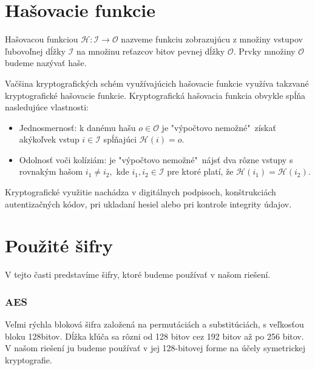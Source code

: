 \section{Hašovacie funkcie}
\begin{mydef}
	Hašovacou funkciou $\mathcal H : \mathcal I \rightarrow \mathcal O$ nazveme funkciu zobrazujúcu z množiny vstupov ľubovoľnej dĺžky $\mathcal I$ na množinu reťazcov bitov pevnej dĺžky $\mathcal O$. Prvky množiny $\mathcal O$ budeme nazývať haše. 
		
\end{mydef}
	Vačšina kryptografických schém využívajúcich hašovacie funkcie využíva takzvané kryptografické hašovacie funkcie. Kryptografická hašovacia funkcia obvykle spĺňa nasledujúce vlastnosti:
	\begin{itemize}
		\item Jednosmernosť: k danému hašu $o \in\mathcal O$ je "výpočtovo nemožné"\ získať akýkoľvek vstup $i \in\mathcal I$ spĺňajúci $\mathcal H(i) = o$.
		\item Odolnosť voči kolíziám: je "výpočtovo nemožné"\ nájsť dva rôzne vstupy s rovnakým hašom $i_1 \ne i_2,$ kde $i_1,i_2 \in\mathcal I$ pre ktoré platí, že $\mathcal H(i_1) = \mathcal H(i_2)$.
	\end{itemize}
	Kryptografické využitie nachádza v digitálnych podpisoch, konštrukciách autentizačných kódov, pri ukladaní hesiel alebo pri kontrole integrity údajov.


\section{Použité šifry}

	V tejto časti predstavíme šifry, ktoré budeme používať v našom riešení. 
	
	\subsubsection{AES}
		

		Veľmi rýchla bloková šifra založená na permutáciách a substitúciách, s veľkosťou bloku 128bitov. Dĺžka kľúča sa rôzni od 128 bitov cez 192 bitov až po 256 bitov. V našom riešení ju budeme používať v jej 128-bitovej forme na účely symetrickej kryptografie.

